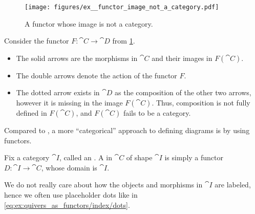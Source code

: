 \begin{example}\label{ex:functor_image_not_a_category}
  \begin{figure}
    \hfill
    \texttt{[image: figures/ex\_\_functor\_image\_not\_a\_category.pdf]}
    \hfill
    \hfill
    \caption{A functor whose image is not a category.}\label{fig:ex:functor_image_not_a_category}
  \end{figure}

  Consider the functor \( F: \cat{C} \to \cat{D} \) from \cref{fig:ex:functor_image_not_a_category}.

  \begin{itemize}
    \item The solid arrows are the morphisms in \( \cat{C} \) and their images in \( F(\cat{C}) \).
    \item The double arrows denote the action of the functor \( F \).
    \item The dotted arrow exists in \( \cat{D} \) as the composition of the other two arrows, however it is missing in the image \( F(\cat{C}) \). Thus, composition is not fully defined in \( F(\cat{C}) \), and \( F(\cat{C}) \) fails to be a category.
  \end{itemize}
\end{example}

\begin{remark}\label{rem:categorical_diagram_as_functor}
  Compared to , a more \enquote{categorical} approach to defining diagrams is by using functors.

  Fix a category \( \cat{I} \), called an . A  in \( \cat{C} \) of shape \( \cat{I} \) is simply a functor \( D: \cat{I} \to \cat{C} \), whose domain is \( \cat{I} \).

  We do not really care about how the objects and morphisms in \( \cat{I} \) are labeled, hence we often use placeholder dots like in \eqref{eq:ex:quivers_as_functors/index/dots}.
\end{remark}

